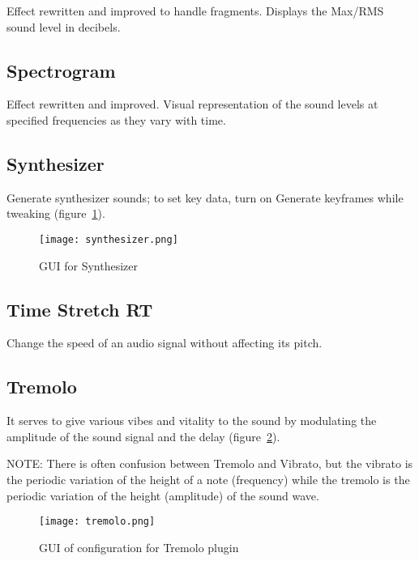 Effect rewritten and improved to handle fragments. Displays the Max/RMS sound level in decibels.

\subsection{Spectrogram}%
\label{sub:Spectrogram}

Effect rewritten and improved. Visual representation of the sound levels at specified frequencies as they vary with time.

\subsection{Synthesizer}%
\label{sub:Synthesizer}

Generate synthesizer sounds; to set key data, turn on Generate keyframes while tweaking (figure~\ref{fig:synthesizer}).

\begin{figure}[htpb]
    \centering
    \texttt{[image: synthesizer.png]}
    \caption{GUI for Synthesizer}
    \label{fig:synthesizer}
\end{figure}

\subsection{Time Stretch RT}%
\label{sub:time_stretch_rt}

Change the speed of an audio signal without affecting its pitch.

\subsection{Tremolo}%
\label{sub:tremolo}

It serves to give various vibes and vitality to the sound by modulating the amplitude of the sound signal and the delay (figure~\ref{fig:tremolo}).

NOTE: There is often confusion between Tremolo and Vibrato, but the vibrato is the periodic variation of the height of a note (frequency) while the tremolo is the periodic variation of the height (amplitude) of the sound wave.

\begin{figure}[htpb]
	\centering
	\texttt{[image: tremolo.png]}
	\caption{GUI of configuration for Tremolo plugin}
	\label{fig:tremolo}
\end{figure}

